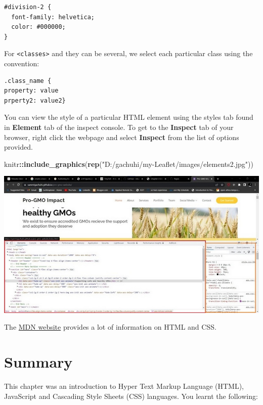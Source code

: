 \documentclass[
]{book}
\newenvironment{Shaded}{\begin{snugshade}}{\end{snugshade}}
\newcommand{\FunctionTok}[1]{\textcolor[rgb]{0.13,0.29,0.53}{\textbf{#1}}}
\newcommand{\NormalTok}[1]{#1}
\newcommand{\SpecialCharTok}[1]{\textcolor[rgb]{0.81,0.36,0.00}{\textbf{#1}}}
\newcommand{\StringTok}[1]{\textcolor[rgb]{0.31,0.60,0.02}{#1}}
\begin{document}
\begin{verbatim}
#division-2 {
  font-family: helvetica;
  color: #000000;
}
\end{verbatim}

For \texttt{\textless{}classes\textgreater{}} and they can be several, we select each particular class using the convention:

\begin{verbatim}
.class_name {
property: value
prperty2: value2}
\end{verbatim}

You can view the style of a particular HTML element using the styles tab found in \textbf{Element} tab of the inspect console. To get to the \textbf{Inspect} tab of your browser, right click the webpage and select \textbf{Inspect} from the list of options provided.

\begin{Shaded}
\begin{Highlighting}[]
\NormalTok{knitr}\SpecialCharTok{::}\FunctionTok{include\_graphics}\NormalTok{(}\FunctionTok{rep}\NormalTok{(}\StringTok{"D:/gachuhi/my{-}Leaflet/images/elements2.jpg"}\NormalTok{))}
\end{Highlighting}
\end{Shaded}

\includegraphics{../images/elements2.jpg}

The \href{https://developer.mozilla.org/en-US/docs/Learn/CSS/First_steps/How_CSS_is_structured}{MDN website} provides a lot of information on HTML and CSS.

\hypertarget{summary}{%
\section{Summary}\label{summary}}

This chapter was an introduction to Hyper Text Markup Language (HTML), JavaScript and Cascading Style Sheets (CSS) languages. You learnt the following:
\end{document}
